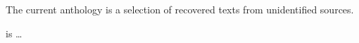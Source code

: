 
{\centering\par
\Large\scshape\chapTitleFont\thetitle
\par}
\vspace*{2\baselineskip}

{%
\setlength{\parskip}{1.5em}
\setlength{\parindent}{0pt}

The current anthology is a selection of recovered texts from unidentified sources.

{\scshape \theauthor} is \ldots

}

